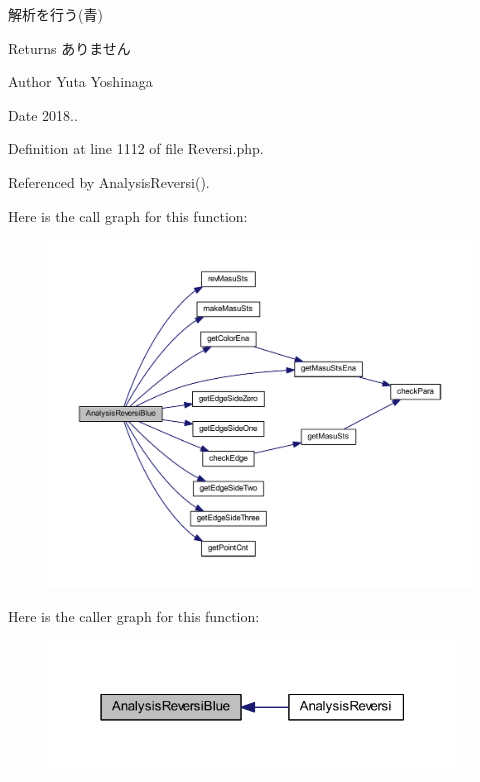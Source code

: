 解析を行う(青) 

\begin{DoxyReturn}{Returns}
ありません 
\end{DoxyReturn}
\begin{DoxyAuthor}{Author}
Yuta Yoshinaga 
\end{DoxyAuthor}
\begin{DoxyDate}{Date}
2018.. 
\end{DoxyDate}


Definition at line 1112 of file Reversi.\+php.



Referenced by Analysis\+Reversi().

Here is the call graph for this function\+:\nopagebreak
\begin{figure}[H]
\begin{center}
\leavevmode
\includegraphics[width=350pt]{class_reversi_a3b581c4861bda72706a1d7146c910ad2_cgraph}
\end{center}
\end{figure}
Here is the caller graph for this function\+:\nopagebreak
\begin{figure}[H]
\begin{center}
\leavevmode
\includegraphics[width=307pt]{class_reversi_a3b581c4861bda72706a1d7146c910ad2_icgraph}
\end{center}
\end{figure}
\mbox{\label{class_reversi_ad44cfa7c45a98365df2d6db094d61901}} 
